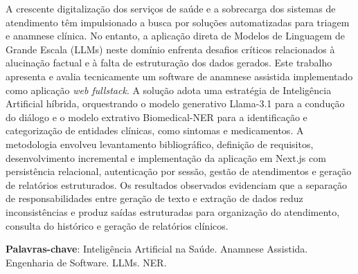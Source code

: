 \begin{resumo}
 A crescente digitalização dos serviços de saúde e a sobrecarga dos sistemas de atendimento têm impulsionado a busca por soluções automatizadas para triagem e anamnese clínica. No entanto, a aplicação direta de Modelos de Linguagem de Grande Escala (LLMs) neste domínio enfrenta desafios críticos relacionados à alucinação factual e à falta de estruturação dos dados gerados. Este trabalho apresenta e avalia tecnicamente um software de anamnese assistida implementado como aplicação \textit{web fullstack}. A solução adota uma estratégia de Inteligência Artificial híbrida, orquestrando o modelo generativo Llama-3.1 para a condução do diálogo e o modelo extrativo Biomedical-NER para a identificação e categorização de entidades clínicas, como sintomas e medicamentos. A metodologia envolveu levantamento bibliográfico, definição de requisitos, desenvolvimento incremental e implementação da aplicação em Next.js com persistência relacional, autenticação por sessão, gestão de atendimentos e geração de relatórios estruturados. Os resultados observados evidenciam que a separação de responsabilidades entre geração de texto e extração de dados reduz inconsistências e produz saídas estruturadas para organização do atendimento, consulta do histórico e geração de relatórios clínicos.

 \vspace{\onelineskip}
    
 \noindent
 \textbf{Palavras-chave}: Inteligência Artificial na Saúde. Anamnese Assistida. Engenharia de Software. LLMs. NER.
\end{resumo}
